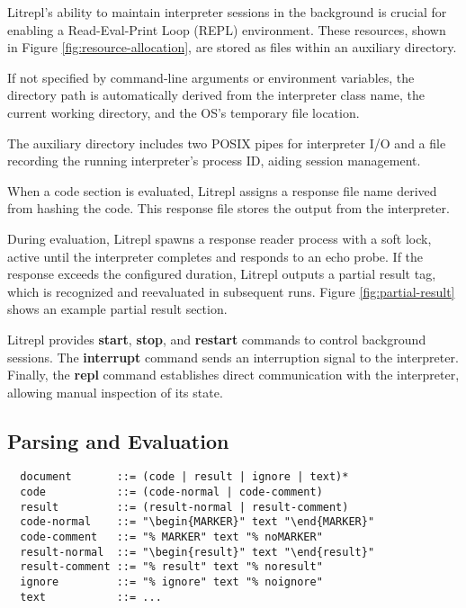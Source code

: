 \documentclass[a4paper,12pt,twocolumn]{article}
\begin{document}
Litrepl's ability to maintain interpreter sessions in the background is crucial
for enabling a Read-Eval-Print Loop (REPL) environment. These resources, shown
in Figure \ref{fig:resource-allocation}, are stored as files within an auxiliary
directory.

If not specified by command-line arguments or environment variables, the
directory path is automatically derived from the interpreter class name, the
current working directory, and the OS's temporary file location.

The auxiliary directory includes two POSIX pipes for interpreter I/O and a file
recording the running interpreter's process ID, aiding session management.

When a code section is evaluated, Litrepl assigns a response file name derived
from hashing the code. This response file stores the output from the
interpreter.

During evaluation, Litrepl spawns a response reader process with a soft lock,
active until the interpreter completes and responds to an echo probe. If the
response exceeds the configured duration, Litrepl outputs a partial result tag,
which is recognized and reevaluated in subsequent runs. Figure
\ref{fig:partial-result} shows an example partial result section.

Litrepl provides \textbf{start}, \textbf{stop}, and \textbf{restart} commands to
control background sessions. The \textbf{interrupt} command sends an
interruption signal to the interpreter. Finally, the \textbf{repl} command
establishes direct communication with the interpreter, allowing manual
inspection of its state.

\subsection{Parsing and Evaluation}

\begin{figure*}[hbt!]
  \centering
  \begin{minipage}{\textwidth}
  \begin{verbatim}
  document       ::= (code | result | ignore | text)*
  code           ::= (code-normal | code-comment)
  result         ::= (result-normal | result-comment)
  code-normal    ::= "\begin{MARKER}" text "\end{MARKER}"
  code-comment   ::= "% MARKER" text "% noMARKER"
  result-normal  ::= "\begin{result}" text "\end{result}"
  result-comment ::= "% result" text "% noresult"
  ignore         ::= "% ignore" text "% noignore"
  text           ::= ...
  \end{verbatim}
  \end{minipage}
  \caption{An illustrative grammar template for LaTeX documents where marker
  serves as a parameter configured via command-line arguments for each supported
  interpreter class.}
  \label{fig:document_representation}
\end{figure*}
\end{document}
